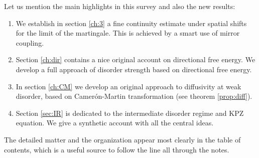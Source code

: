 Let us mention the main highlights in this survey and also the new results:
 \begin{enumerate}
 \item We establish in section \ref{ch:3} a fine continuity estimate under spatial shifts for the limit of the martingale. This is achieved by a smart use of mirror coupling. 
\item Section \ref{ch:dir} contains a nice original account on directional free energy. We develop a full approach of
disorder strength based on directional free energy.
\item In section \ref{ch:CM} we develop an original approach to diffusivity at weak disorder, based on Camer\'on-Martin transformation (see theorem \ref{prop:diff}).
\item Section \ref{sec:IR} is dedicated to the intermediate disorder regime and KPZ equation. We give a synthetic account with all the central ideas. 
\end{enumerate}

The detailed matter and the organization appear most clearly in the table of contents,
which is a useful source to follow the line all through the notes. 

